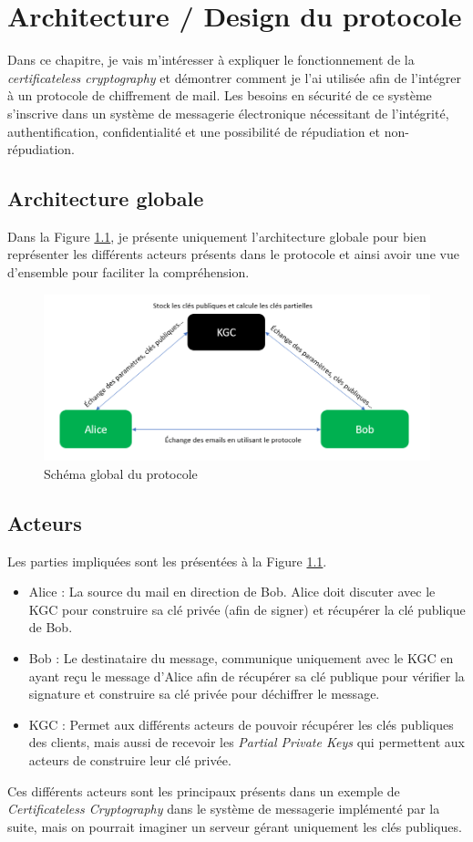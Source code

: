 \chapter{Architecture / Design du protocole}
\label{ch:arch}
Dans ce chapitre, je vais m'intéresser à expliquer le fonctionnement de la \textit{certificateless cryptography} et démontrer comment je l'ai utilisée afin de l'intégrer à un protocole de chiffrement de mail. Les besoins en sécurité de ce système s'inscrive dans un système de messagerie électronique nécessitant de l'intégrité, authentification, confidentialité et une possibilité de répudiation et non-répudiation.
\section{Architecture globale}
Dans la Figure \ref{fig:globalProtocol}, je présente uniquement l'architecture globale pour bien représenter les différents acteurs présents dans le protocole et ainsi avoir une vue d'ensemble pour faciliter la compréhension.

\begin{figure}[h!]
	\centering
	\includegraphics[width=14cm]{images/SchemaGlobal.png}
	\caption{Schéma global du protocole}
	\label{fig:globalProtocol}
\end{figure}

\section{Acteurs}
Les parties impliquées sont les présentées à la Figure \ref{fig:globalProtocol}.
\begin{itemize}
	\item Alice : La source du mail en direction de Bob. Alice doit discuter avec le KGC pour construire sa clé privée (afin de signer) et récupérer la clé publique de Bob.
	\item Bob : Le destinataire du message, communique uniquement avec le KGC en ayant reçu le message d'Alice afin de récupérer sa clé publique pour vérifier la signature et construire sa clé privée pour déchiffrer le message.
	\item KGC : Permet aux différents acteurs de pouvoir récupérer les clés publiques des clients, mais aussi de  recevoir les \textit{Partial Private Keys} qui permettent aux acteurs de construire leur clé privée. 
\end{itemize}
Ces différents acteurs sont les principaux présents dans un exemple de \textit{Certificateless Cryptography} dans le système de messagerie implémenté par la suite, mais on pourrait imaginer un serveur gérant uniquement les clés publiques.
